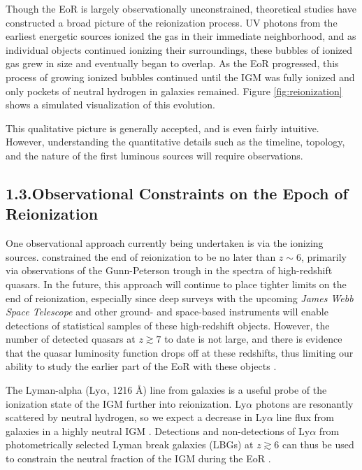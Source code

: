 \documentclass[12pt]{article}
\begin{document}
Though the EoR is largely observationally unconstrained, theoretical studies have constructed a broad picture of the reionization process. UV photons from the earliest energetic sources ionized the gas in their immediate neighborhood, and as individual objects continued ionizing their surroundings, these bubbles of ionized gas grew in size and eventually began to overlap. As the EoR progressed, this process of growing ionized bubbles continued until the IGM was fully ionized and only pockets of neutral hydrogen in galaxies remained. Figure \ref{fig:reionization} shows a simulated visualization of this evolution.

This qualitative picture is generally accepted, and is even fairly intuitive. However, understanding the quantitative details such as the timeline, topology, and the nature of the first luminous sources will require observations. \vspace{3mm}

\tocless\subsection{\hypertarget{subsec:constraints}{1.3.\hspace{0.75em}Observational Constraints on the Epoch of Reionization}}

One observational approach currently being undertaken is via the ionizing sources. \cite{fan2006} constrained the end of reionization to be no later than $z \sim 6$, primarily via observations of the Gunn-Peterson trough in the spectra of high-redshift quasars. In the future, this approach will continue to place tighter limits on the end of reionization, especially since deep surveys with the upcoming \textit{James Webb Space Telescope} and other ground- and space-based instruments will enable detections of statistical samples of these high-redshift objects. However, the number of detected quasars at $z \gtrsim 7$ to date is not large, and there is evidence that the quasar luminosity function drops off at these redshifts, thus limiting our ability to study the earlier part of the EoR with these objects \citep{richards2006, hopkins2007}.

The Lyman-alpha (Ly$\alpha$, 1216 \AA) line from galaxies is a useful probe of the ionization state of the IGM further into reionization. Ly$\alpha$ photons are resonantly scattered by neutral hydrogen, so we expect a decrease in Ly$\alpha$ line flux from galaxies in a highly neutral IGM \citep{malhotra2004}. Detections and non-detections of Ly$\alpha$ from photometrically selected Lyman break galaxies (LBGs) at $z \gtrsim 6$ can thus be used to constrain the neutral fraction of the IGM during the EoR \citep{mason2018}.
\end{document}
